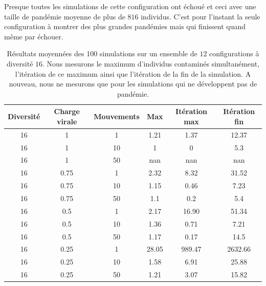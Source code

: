 Presque toutes les simulations de cette configuration ont échoué et ceci avec une taille de pandémie moyenne de plus de $816$ individus. C'est pour l'instant la seule configuration à montrer des plus grandes pandémies mais qui finissent quand même par échouer.

\begin{table}[H]
	\centering
	\renewcommand{\arraystretch}{0.6}
	\captionsetup{justification=centering}
	\caption[Statistiques : diversité 16]{Résultats moyennées des 100 simulations sur un ensemble de $12$ configurations à diversité $16$. Nous mesurons le maximum d'individus contaminés simultanément, l'itération de ce maximum ainsi que l'itération de la fin de la simulation. A nouveau, nous ne mesurons que pour les simulations qui ne développent pas de pandémie.\label{tab:grid}}
	\begin{tabular}{@{\extracolsep{\fill} } |c| c| c| c| c| c|}
		\toprule
		Diversité & Charge virale & Mouvements & Max   & Itération max & Itération fin \\
		\midrule
		16        & 1             & 1          & 1.21  & 1.37          & 12.37         \\
		\midrule
		16        & 1             & 10         & 1     & 0             & 5.3           \\
		\midrule
		16        & 1             & 50         & nan   & nan           & nan           \\
		\midrule
		16        & 0.75          & 1          & 2.32  & 8.32          & 31.52         \\
		\midrule
		16        & 0.75          & 10         & 1.15  & 0.46          & 7.23          \\
		\midrule
		16        & 0.75          & 50         & 1.1   & 0.2           & 5.4           \\
		\midrule
		16        & 0.5           & 1          & 2.17  & 16.90         & 51.34         \\
		\midrule
		16        & 0.5           & 10         & 1.36  & 0.71          & 7.21          \\
		\midrule
		16        & 0.5           & 50         & 1.17  & 0.17          & 14.5          \\
		\midrule
		16        & 0.25          & 1          & 28.05 & 989.47        & 2632.66       \\
		\midrule
		16        & 0.25          & 10         & 1.58  & 6.91          & 25.88         \\
		\midrule
		16        & 0.25          & 50         & 1.21  & 3.07          & 15.82         \\
		\bottomrule
	\end{tabular}
\end{table}

